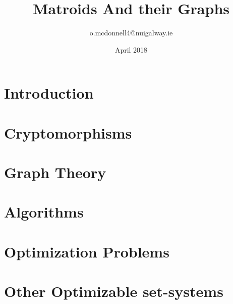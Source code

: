 \documentclass{article}
\title{Matroids And their Graphs}
\author{o.mcdonnell4@nuigalway.ie }
\date{April 2018}
\theoremstyle{plain}
\theoremstyle{definition}
\theoremstyle{remark}
\begin{document}
 
\maketitle
 


\section{Introduction}





\section{Cryptomorphisms}





\section{Graph Theory}


\section{Algorithms}




\section{Optimization Problems}




\section{Other Optimizable set-systems}


\printbibliography[
heading=bibintoc,
title={Whole bibliography}
] %
\end{document}
